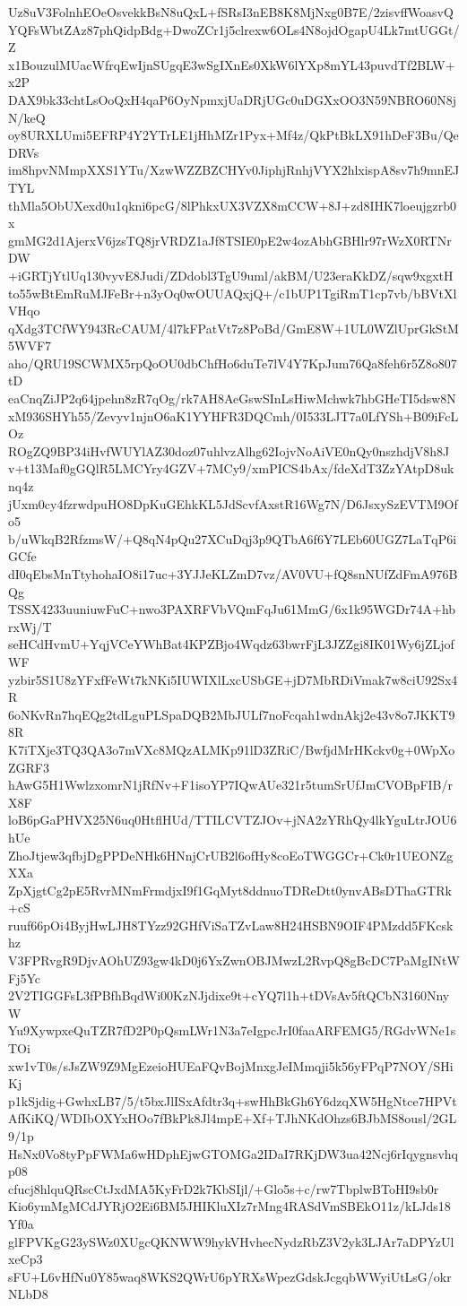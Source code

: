 Uz8uV3FolnhEOeOsvekkBsN8uQxL+fSRsI3nEB8K8MjNxg0B7E/2zisvffWoasvQ
YQFsWbtZAz87phQidpBdg+DwoZCr1j5clrexw6OLs4N8ojdOgapU4Lk7mtUGGt/Z
x1BouzulMUacWfrqEwIjnSUgqE3wSgIXnEs0XkW6lYXp8mYL43puvdTf2BLW+x2P
DAX9bk33chtLsOoQxH4qaP6OyNpmxjUaDRjUGc0uDGXxOO3N59NBRO60N8jN/keQ
oy8URXLUmi5EFRP4Y2YTrLE1jHhMZr1Pyx+Mf4z/QkPtBkLX91hDeF3Bu/QeDRVs
im8hpvNMmpXXS1YTu/XzwWZZBZCHYv0JiphjRnhjVYX2hlxispA8sv7h9mnEJTYL
thMla5ObUXexd0u1qkni6pcG/8lPhkxUX3VZX8mCCW+8J+zd8IHK7loeujgzrb0x
gmMG2d1AjerxV6jzsTQ8jrVRDZ1aJf8TSIE0pE2w4ozAbhGBHlr97rWzX0RTNrDW
+iGRTjYtlUq130vyvE8Judi/ZDdobl3TgU9uml/akBM/U23eraKkDZ/sqw9xgxtH
to55wBtEmRuMJFeBr+n3yOq0wOUUAQxjQ+/c1bUP1TgiRmT1cp7vb/bBVtXlVHqo
qXdg3TCfWY943RcCAUM/4l7kFPatVt7z8PoBd/GmE8W+1UL0WZlUprGkStM5WVF7
aho/QRU19SCWMX5rpQoOU0dbChfHo6duTe7lV4Y7KpJum76Qa8feh6r5Z8o807tD
eaCnqZiJP2q64jpehn8zR7qOg/rk7AH8AeGswSInLsHiwMchwk7hbGHeTI5dsw8N
xM936SHYh55/Zevyv1njnO6aK1YYHFR3DQCmh/0I533LJT7a0LfYSh+B09iFcLOz
ROgZQ9BP34iHvfWUYlAZ30doz07uhlvzAlhg62IojvNoAiVE0nQy0nszhdjV8h8J
v+t13Maf0gGQlR5LMCYry4GZV+7MCy9/xmPICS4bAx/fdeXdT3ZzYAtpD8uknq4z
jUxm0cy4fzrwdpuHO8DpKuGEhkKL5JdScvfAxstR16Wg7N/D6JsxySzEVTM9Ofo5
b/uWkqB2RfzmsW/+Q8qN4pQu27XCuDqj3p9QTbA6f6Y7LEb60UGZ7LaTqP6iGCfe
dI0qEbsMnTtyhohaIO8i17uc+3YJJeKLZmD7vz/AV0VU+fQ8snNUfZdFmA976BQg
TSSX4233uuniuwFuC+nwo3PAXRFVbVQmFqJu61MmG/6x1k95WGDr74A+hbrxWj/T
seHCdHvmU+YqjVCeYWhBat4KPZBjo4Wqdz63bwrFjL3JZZgi8IK01Wy6jZLjofWF
yzbir5S1U8zYFxfFeWt7kNKi5IUWIXlLxcUSbGE+jD7MbRDiVmak7w8ciU92Sx4R
6oNKvRn7hqEQg2tdLguPLSpaDQB2MbJULf7noFcqah1wdnAkj2e43v8o7JKKT98R
K7iTXje3TQ3QA3o7mVXc8MQzALMKp91lD3ZRiC/BwfjdMrHKckv0g+0WpXoZGRF3
hAwG5H1WwlzxomrN1jRfNv+F1isoYP7IQwAUe321r5tumSrUfJmCVOBpFIB/rX8F
loB6pGaPHVX25N6uq0HtflHUd/TTILCVTZJOv+jNA2zYRhQy4lkYguLtrJOU6hUe
ZhoJtjew3qfbjDgPPDeNHk6HNnjCrUB2l6ofHy8coEoTWGGCr+Ck0r1UEONZgXXa
ZpXjgtCg2pE5RvrMNmFrmdjxI9f1GqMyt8ddnuoTDReDtt0ynvABsDThaGTRk+cS
ruuf66pOi4ByjHwLJH8TYzz92GHfViSaTZvLaw8H24HSBN9OIF4PMzdd5FKcskhz
V3FPRvgR9DjvAOhUZ93gw4kD0j6YxZwnOBJMwzL2RvpQ8gBcDC7PaMgINtWFj5Yc
2V2TIGGFsL3fPBfhBqdWi00KzNJjdixe9t+cYQ7l1h+tDVsAv5ftQCbN3160NnyW
Yu9XywpxeQuTZR7fD2P0pQsmLWr1N3a7eIgpcJrI0faaARFEMG5/RGdvWNe1sTOi
xw1vT0s/sJsZW9Z9MgEzeioHUEaFQvBojMnxgJeIMmqji5k56yFPqP7NOY/SHiKj
p1kSjdig+GwhxLB7/5/t5bxJlISxAfdtr3q+swHhBkGh6Y6dzqXW5HgNtce7HPVt
AfKiKQ/WDIbOXYxHOo7fBkPk8Jl4mpE+Xf+TJhNKdOhzs6BJbMS8ousl/2GL9/1p
HsNx0Vo8tyPpFWMa6wHDphEjwGTOMGa2IDaI7RKjDW3ua42Ncj6rIqygnsvhqp08
cfucj8hlquQRscCtJxdMA5KyFrD2k7KbSIjl/+Glo5s+c/rw7TbplwBToHI9sb0r
Kio6ymMgMCdJYRjO2Ei6BM5JHIKluXIz7rMng4RASdVmSBEkO11z/kLJds18Yf0a
glFPVKgG23ySWz0XUgcQKNWW9hykVHvhecNydzRbZ3V2yk3LJAr7aDPYzUlxeCp3
sFU+L6vHfNu0Y85waq8WKS2QWrU6pYRXsWpezGdskJcgqbWWyiUtLsG/okrNLbD8
